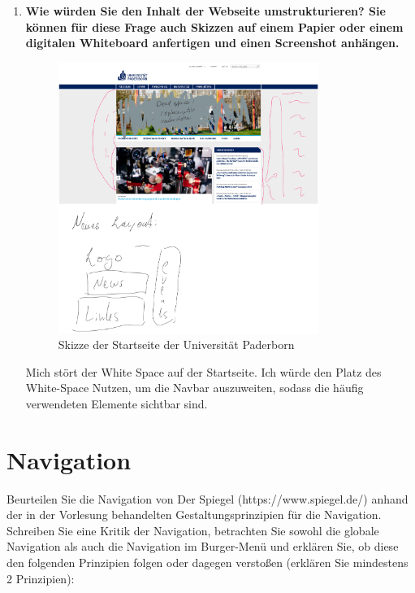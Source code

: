 \documentclass[a4paper,12pt]{article}
\begin{document}
\begin{enumerate}[label=\alph*)]
  \item \textbf{Wie würden Sie den Inhalt der Webseite umstrukturieren? Sie können für
          diese Frage auch Skizzen auf einem Papier oder einem digitalen Whiteboard
          anfertigen und einen Screenshot anhängen.}

        \begin{figure}
          \centering
          \includegraphics[width=0.8\textwidth]{./2023-05-08-4P5owdQYFDNH4AAAAASUVORK5CYII.png}
          \caption{Skizze der Startseite der Universität Paderborn}
        \end{figure}

        Mich stört der White Space auf der Startseite. Ich würde den Platz des
        White-Space Nutzen, um die Navbar auszuweiten, sodass die häufig
        verwendeten Elemente sichtbar sind.
\end{enumerate}


\section{Navigation}
Beurteilen Sie die Navigation von Der Spiegel (https://www.spiegel.de/)
anhand der in der Vorlesung behandelten Gestaltungsprinzipien für die
Navigation. Schreiben Sie eine Kritik der Navigation, betrachten Sie
sowohl die globale Navigation als auch die Navigation im Burger-Menü und
erklären Sie, ob diese den folgenden Prinzipien folgen oder dagegen
verstoßen (erklären Sie mindestens 2 Prinzipien):

\end{document}
